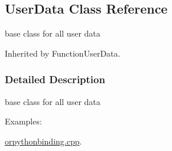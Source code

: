 \hypertarget{classOpenRAVE_1_1UserData}{
\subsection{UserData Class Reference}
\label{classOpenRAVE_1_1UserData}
}


base class for all user data  




Inherited by FunctionUserData.



\subsubsection{Detailed Description}
base class for all user data \begin{Desc}
\item[Examples: ]\par


\hyperlink{orpythonbinding_8cpp-example}{orpythonbinding.cpp}.

\end{Desc}
